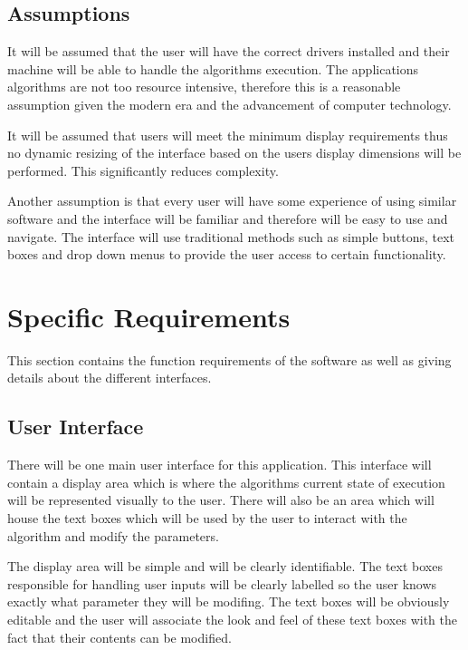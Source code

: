 \subsection{Assumptions}

It will be assumed that the user will have the correct drivers installed and their machine will be able to handle the algorithms execution. The applications algorithms are not too resource intensive, therefore this is a reasonable assumption given the modern era and the advancement of computer technology.

It will be assumed that users will meet the minimum display requirements thus no dynamic resizing of the interface based on the users display dimensions will be performed. This significantly reduces complexity.

Another assumption is that every user will have some experience of using similar software and the interface will be familiar and therefore will be easy to use and navigate. The interface will use traditional methods such as simple buttons, text boxes and drop down menus to provide the user access to certain functionality.

\section{Specific Requirements}

This section contains the function requirements of the software as well as giving details about the different interfaces.

\subsection{User Interface}

There will be one main user interface for this application. This interface will contain a display area which is where the algorithms current state of execution will be represented visually to the user. There will also be an area which will house the text boxes which will be used by the user to interact with the algorithm and modify the parameters.

The display area will be simple and will be clearly identifiable. The text boxes responsible for handling user inputs will be clearly labelled so the user knows exactly what parameter they will be modifing. The text boxes will be obviously editable and the user will associate the look and feel of these text boxes with the fact that their contents can be modified.


